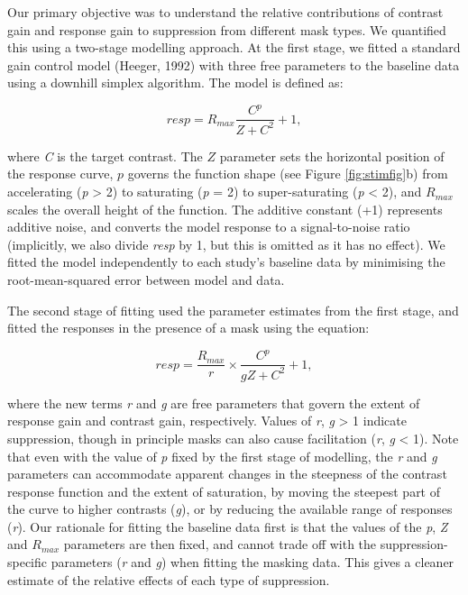 \documentclass[]{article}
\begin{document}
Our primary objective was to understand the relative contributions of contrast gain and response gain to suppression from different mask types. We quantified this using a two-stage modelling approach. At the first stage, we fitted a standard gain control model (Heeger, 1992) with three free parameters to the baseline data using a downhill simplex algorithm. The model is defined as:

\begin{equation}
\label{eq:GC1}
resp = R_{max}\frac{C^p}{Z + C^2} + 1,
\end{equation}

\noindent where \emph{C} is the target contrast. The \(Z\) parameter sets the horizontal position of the response curve, \(p\) governs the function shape (see Figure \ref{fig:stimfig}b) from accelerating (\emph{p} \textgreater{} 2) to saturating (\emph{p} = 2) to super-saturating (\emph{p} \textless{} 2), and \(R_{max}\) scales the overall height of the function. The additive constant (+1) represents additive noise, and converts the model response to a signal-to-noise ratio (implicitly, we also divide \emph{resp} by 1, but this is omitted as it has no effect). We fitted the model independently to each study's baseline data by minimising the root-mean-squared error between model and data.

The second stage of fitting used the parameter estimates from the first stage, and fitted the responses in the presence of a mask using the equation:

\begin{equation}
\label{eq:GC2}
resp = \frac{R_{max}}{r} \times \frac{C^p}{gZ + C^2} + 1,
\end{equation}

\noindent where the new terms \emph{r} and \emph{g} are free parameters that govern the extent of response gain and contrast gain, respectively. Values of \emph{r}, \emph{g} \textgreater{} 1 indicate suppression, though in principle masks can also cause facilitation (\emph{r}, \emph{g} \textless{} 1). Note that even with the value of \emph{p} fixed by the first stage of modelling, the \emph{r} and \emph{g} parameters can accommodate apparent changes in the steepness of the contrast response function and the extent of saturation, by moving the steepest part of the curve to higher contrasts (\emph{g}), or by reducing the available range of responses (\emph{r}). Our rationale for fitting the baseline data first is that the values of the \emph{p}, \emph{Z} and \(R_{max}\) parameters are then fixed, and cannot trade off with the suppression-specific parameters (\emph{r} and \emph{g}) when fitting the masking data. This gives a cleaner estimate of the relative effects of each type of suppression.
\end{document}
